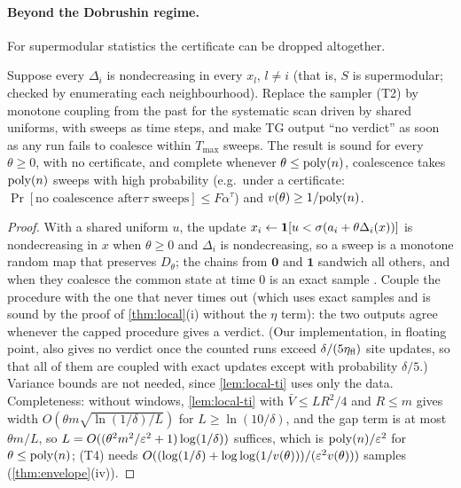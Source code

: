 \paragraph{Beyond the Dobrushin regime.} For supermodular statistics the certificate
can be dropped altogether.

\begin{proposition}\label{prop:local-cftp}
Suppose every $\Delta_i$ is nondecreasing in every $x_l$, $l\ne i$ (that is, $S$ is
supermodular; checked by enumerating each neighbourhood). Replace the sampler (T2) by
monotone coupling from the past \cite{pw1996} for the systematic scan driven by shared
uniforms, with sweeps as time steps, and make TG output ``no verdict'' as soon as any run
fails to coalesce within $T_{\max}$ sweeps. The result is sound for every $\theta\ge0$, with
no certificate, and complete whenever $\theta\le\mathrm{poly}(n)$, coalescence takes $\mathrm{poly}(n)$
sweeps with high probability (e.g.\ under a certificate: $\Pr[\text{no coalescence after
}\tau\text{ sweeps}]\le F\alpha^\tau$) and $v(\theta)\ge1/\mathrm{poly}(n)$.
\end{proposition}

\begin{proof}
With a shared uniform $u$, the update $x_i\gets\mathbf{1}[u<\sigma(a_i+\theta\Delta_i(x))]$ is
nondecreasing in $x$ when $\theta\ge0$ and $\Delta_i$ is nondecreasing, so a sweep is a
monotone random map that preserves $D_\theta$; the chains from $\mathbf0$ and $\mathbf1$
sandwich all others, and when they coalesce the common state at time $0$ is an exact
sample \cite{pw1996}. Couple the procedure with the one that never times out (which
uses exact samples and is sound by the proof of \cref{thm:local}(i) without the $\eta$
term): the two outputs agree whenever the capped procedure gives a verdict. (Our
implementation, in floating point, also gives no verdict once the counted runs exceed
$\delta/(5\eta_{\rm fl})$ site updates, so that all of them are coupled with exact
updates except with probability $\delta/5$.) Variance
bounds are not needed, since \cref{lem:local-ti} uses only the data. Completeness: without
windows, \cref{lem:local-ti} with $\bar V\le LR^2/4$ and $R\le m$ gives width
$O(\theta m\sqrt{\ln(1/\delta)/L})$ for $L\ge\ln(10/\delta)$, and the gap term is at most $\theta m/L$, so
$L=O((\theta^2m^2/\varepsilon^2+1)\log(1/\delta))$ suffices, which is $\mathrm{poly}(n)/\varepsilon^2$ for
$\theta\le\mathrm{poly}(n)$; (T4) needs $O((\log(1/\delta)+\log\log(1/v(\theta)))/(\varepsilon^2v(\theta)))$
samples (\cref{thm:envelope}(iv)).
\end{proof}

